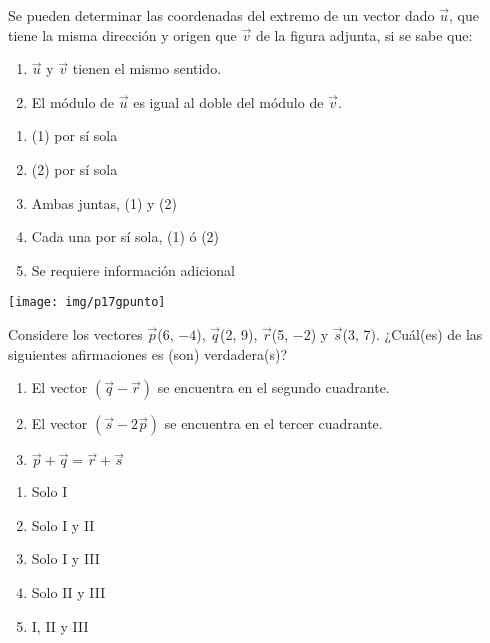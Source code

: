 \begin{enumerate}[label=\large{\textbf{\arabic*.}}, itemsep = 0.15cm, topsep = 0.5cm]
	
	\parbox{1\linewidth}{\item Se pueden determinar las coordenadas del extremo de un vector dado $\vec{u}$, que tiene la misma dirección y origen que $\vec{v}$ de la figura adjunta, si se sabe que: 	
		\begin{enumerate}[label={(\arabic*)}, leftmargin = 3cm, topsep = 0.5cm]
			\item $\vec{u}$ y $\vec{v}$ tienen el mismo sentido.
			\item El módulo de $\vec{u}$ es igual al doble del módulo de $\vec{v}$.
		\end{enumerate}
		\begin{minipage}[t][3cm][t]{0.5\linewidth}
			\begin{enumerate}[label={\Alph*)}, itemsep = 0.15cm, topsep = 0.5cm]
				\item (1) por sí sola
				\item (2) por sí sola
				\item Ambas juntas, (1) y (2)
				\item Cada una por sí sola, (1) ó (2)
				\item Se requiere información adicional
			\end{enumerate}
		\end{minipage}
		\begin{minipage}[t][1cm][t]{0.49\linewidth}
			\vspace{0cm} %
			\hspace{0cm} %
			\texttt{[image: img/p17gpunto]} %
	\end{minipage}}
	
	\vspace*{1cm}
	
	\parbox{1\linewidth}{ \item Considere los vectores $\vec{p}$(6, $-4$), $\vec{q}$(2, 9), $\vec{r}$(5, $-2$) y $\vec{s}$(3, 7). ¿Cuál(es) de las siguientes afirmaciones es (son) verdadera(s)?	
		\begin{enumerate}[label={\Roman*)}, itemsep = 0.5cm, topsep = 0.5cm, leftmargin = 2.4cm]
			\item El vector $(\vec{q}-\vec{r})$ se encuentra en el segundo cuadrante.
			\item El vector $(\vec{s}-2\vec{p})$ se encuentra en el tercer cuadrante.
			\item $\vec{p}+\vec{q}=\vec{r}+\vec{s}$
		\end{enumerate}
		\begin{enumerate}[label={\Alph*)}, itemsep = 0.15cm, topsep = 0.3cm]
			\item Solo I
			\item Solo I y II
			\item Solo I y III
			\item Solo II y III
			\item I, II y III
	\end{enumerate}}
	

\end{enumerate}
